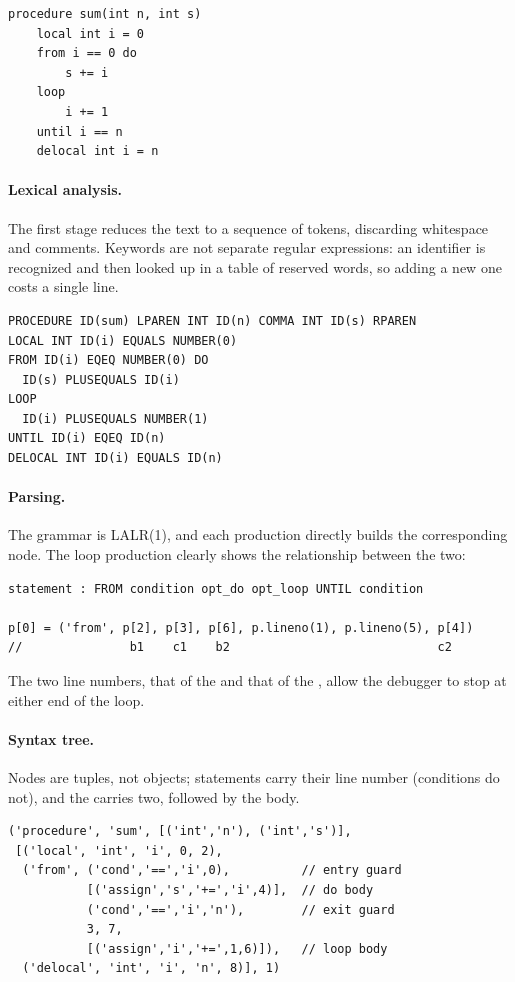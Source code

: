 \begin{lstlisting}
procedure sum(int n, int s)
    local int i = 0
    from i == 0 do
        s += i
    loop
        i += 1
    until i == n
    delocal int i = n
\end{lstlisting}

\paragraph{Lexical analysis.} The first stage reduces the text to a sequence of
tokens, discarding whitespace and comments. Keywords are not separate regular
expressions: an identifier is recognized and then looked up in a table of reserved
words, so adding a new one costs a single line.

\begin{lstlisting}
PROCEDURE ID(sum) LPAREN INT ID(n) COMMA INT ID(s) RPAREN
LOCAL INT ID(i) EQUALS NUMBER(0)
FROM ID(i) EQEQ NUMBER(0) DO
  ID(s) PLUSEQUALS ID(i)
LOOP
  ID(i) PLUSEQUALS NUMBER(1)
UNTIL ID(i) EQEQ ID(n)
DELOCAL INT ID(i) EQUALS ID(n)
\end{lstlisting}

\paragraph{Parsing.} The grammar is LALR(1), and each production directly
builds the corresponding node. The loop production clearly shows the
relationship between the two:

\begin{lstlisting}
statement : FROM condition opt_do opt_loop UNTIL condition

p[0] = ('from', p[2], p[3], p[6], p.lineno(1), p.lineno(5), p[4])
//               b1    c1    b2                             c2
\end{lstlisting}

\noindent
The two line numbers, that of the  and that of the ,
allow the debugger to stop at either end of the loop.

\paragraph{Syntax tree.} Nodes are tuples, not objects; statements carry their
line number (conditions do not), and the  carries two, followed
by the  body.

\begin{lstlisting}
('procedure', 'sum', [('int','n'), ('int','s')],
 [('local', 'int', 'i', 0, 2),
  ('from', ('cond','==','i',0),          // entry guard
           [('assign','s','+=','i',4)],  // do body
           ('cond','==','i','n'),        // exit guard
           3, 7,
           [('assign','i','+=',1,6)]),   // loop body
  ('delocal', 'int', 'i', 'n', 8)], 1)
\end{lstlisting}

